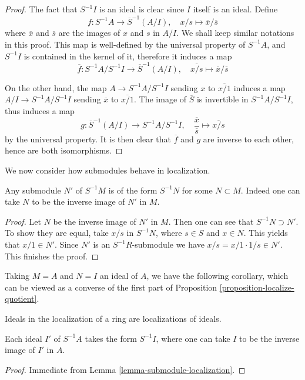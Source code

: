 \begin{proof}
The fact that $S^{-1}I$ is an ideal is clear since $I$ itself is an
ideal. Define
$$
f : S^{-1}A\longrightarrow \overline{S}^{-1}(A/I), \quad x/s\mapsto
\overline{x}/\overline{s}
$$
where $\overline{x}$ and $\overline{s}$ are the images of $x$ and
$s$ in $A/I$. We shall keep similar notations in this proof.
This map is well-defined by the universal property of
$S^{-1}A$, and $S^{-1}I$ is contained in the kernel of it,
therefore it induces a map
$$
\overline{f} : S^{-1}A/S^{-1}I \longrightarrow \overline{S}^{-1}(A/I), \quad
\overline{x/s}\mapsto \overline{x}/\overline{s}
$$

\medskip\noindent
On the other hand, the map $A \to S^{-1}A/S^{-1}I$ sending $x$ to
$\overline{x/1}$ induces a map $A/I \to S^{-1}A/S^{-1}I$ sending
$\overline{x}$ to $\overline{x/1}$. The image of $\overline{S}$ is
invertible in $S^{-1}A/S^{-1}I$, thus induces a map
$$
g : \overline{S}^{-1}(A/I) \longrightarrow S^{-1}A/S^{-1}I, \quad
\frac{\overline{x}}{\overline{s}}\mapsto \overline{x/s}
$$
by the universal property. It is then clear that $\overline{f}$ and $g$
are inverse to each other, hence are both isomorphisms.
\end{proof}

\noindent
We now consider how submodules behave in localization.

\begin{lemma}
\label{lemma-submodule-localization}
Any submodule $N'$ of $S^{-1}M$ is of the form $S^{-1}N$ for some
$N\subset M$. Indeed one can take $N$ to be the inverse image of
$N'$ in $M$.
\end{lemma}

\begin{proof}
Let $N$ be the inverse image of $N'$ in $M$. Then one can see that
$S^{-1}N\supset N'$. To show they are equal, take $x/s$ in
$S^{-1}N$, where $s\in S$ and $x\in N$. This yields that $x/1\in
N'$. Since $N'$ is an $S^{-1}R$-submodule we have
$x/s = x/1\cdot 1/s\in N'$. This finishes the proof.
\end{proof}

\noindent
Taking $M = A$ and $N = I$ an ideal of $A$, we have the following
corollary, which can be viewed as a converse of the first part of
Proposition \ref{proposition-localize-quotient}.

\begin{lemma}
\label{lemma-ideal-in-localization}
\begin{slogan}
Ideals in the localization of a ring are localizations of ideals.
\end{slogan}
Each ideal $I'$ of $S^{-1}A$ takes the form $S^{-1}I$, where one can
take $I$ to be the inverse image of $I'$ in $A$.
\end{lemma}

\begin{proof}
Immediate from Lemma \ref{lemma-submodule-localization}.
\end{proof}










